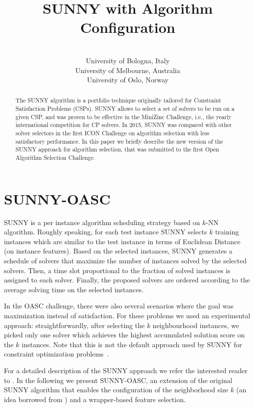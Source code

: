 \documentclass[tablecaption=bottom,wcp]{jmlr} %
\title[SUNNY-OASC]{SUNNY with Algorithm Configuration}
\author{\Name{Tong Liu} \Email{t.liu@unibo.it}\\
 \addr University of Bologna, Italy 
 \AND
 \Name{Roberto Amadini} \Email{roberto.amadini@unimelb.edu.au}\\
 \addr University of Melbourne, Australia
 \AND
 \Name{Jacopo Mauro} \Email{mauro.jacopo@gmail.com}\\
 \addr University of Oslo, Norway
 }
\begin{document}
\maketitle

\begin{abstract}
The SUNNY algorithm is a portfolio technique originally tailored for 
Constraint Satisfaction Problems (CSPs). SUNNY allows to select a set of 
solvers to be run on a given CSP, and was proven to be effective in the 
MiniZinc Challenge, i.e., the yearly international competition 
for CP solvers. In 2015, SUNNY was compared with other solver selectors in the 
first ICON Challenge on algorithm selection with less satisfactory performance.
In this paper we briefly describe the new version of the SUNNY approach for 
algorithm selection, that was submitted to the first Open Algorithm 
Selection Challenge.
\end{abstract}


\section{SUNNY-OASC}

SUNNY is a per instance algorithm scheduling strategy based on $k$-NN algorithm.
Roughly speaking, for each test instance SUNNY selects
$k$ training instances which are similar to the test instance
in terms of Euclidean Distance (on instance features). Based on the selected instances,
SUNNY generates a schedule of solvers that maximize the number of
instances solved by the selected solvers. 
Then, a time slot proportional to the fraction of solved instances is
assigned to each solver. Finally, the proposed solvers are ordered
according to the average solving time on the selected instances.

In the OASC challenge, there were also several scenarios 
where the goal was maximization instead of satisfaction.
For these problems we used an experimental approach:
straightforwardly, after selecting the $k$ neighbourhood instances, 
we picked only one solver which achieves the highest accumulated solution score 
on the $k$ instances.
Note that this is not the default approach used by SUNNY for constraint 
optimization problems~\citep{sunnycp2,paper_amai}.

For a detailed description of the SUNNY approach we refer the interested 
reader to \cite{sunny,sunnycp2,paper_amai}.
In the following we present SUNNY-OASC, an extension of the
original SUNNY algorithm that enables the configuration of the neighborhood 
size $k$ 
(an idea borrowed from \cite{DBLP:conf/lion/LindauerBH16}) and a 
wrapper-based feature selection.
\end{document}
